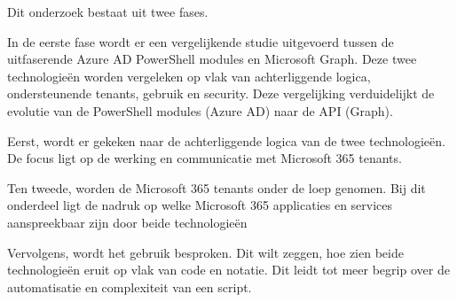 \begin{comment}
In de derde fase volgt een nabootsing van een realistische Linux-omgeving. Aan de hand van geautomatiseerde configuraties ontstaat de mogelijkheid om een omgeving op te zetten. Hierbij wordt Ansible als Configuration Management tool ingezet voor het opzetten van de infrastructuur. In de testomgeving voorzien we vier virtuele servers en een virtuele client. Waarbij alle virtuele machines AlmaLinux \autocite{AOF2022} als distributie gebruiken. De eerste server maakt gebruik van BIND \autocite{ISC2022} om de DNS (Domain Name System) te voorzien. De tweede server voorziet DHCP (Dynamic Host Configuration Protocol) met dynamische IP-adressen voor de virtuele client. De derde server fungeert als webserver en databank met een \textcite{WordPress2022} installatie. De laatste server maakt gebruik van Prometheus \autocite{PrometheusAuthors2022} en Grafana \autocite{GrafanaLabs2022} om de servers te kunnen monitoren. De client is een gebruiker van het domein en test de beschikbare functionaliteiten.

De laatste fase omvat een Disaster Recovery-scenario waarbij de omgeving wordt beschadigd. Door deze beschadiging wordt de omgeving nogmaals opgezet aan de hand van automatisatie uit de tweede fase. Er wordt gekeken naar welke impact de automatisatie heeft in vergelijking met de manuele manier van configureren. Deze impact wordt geanalyseerd en getest, nadien worden alle bevinden verwerkt in de scriptie.

\end{comment}

Dit onderzoek bestaat uit twee fases.
 
In de eerste fase wordt er een vergelijkende studie uitgevoerd tussen de uitfaserende Azure AD PowerShell modules en Microsoft Graph. Deze twee technologieën worden vergeleken op vlak van achterliggende logica, ondersteunende tenants, gebruik en security. Deze vergelijking verduidelijkt de evolutie van de PowerShell modules (Azure AD) naar de API (Graph).

Eerst, wordt er gekeken naar de achterliggende logica van de twee technologieën. De focus ligt op de werking en communicatie met Microsoft 365 tenants. 

Ten tweede, worden de Microsoft 365 tenants onder de loep genomen. Bij dit onderdeel ligt de nadruk op welke Microsoft 365 applicaties en services aanspreekbaar zijn door beide technologieën

Vervolgens, wordt het gebruik besproken. Dit wilt zeggen, hoe zien beide technologieën eruit op vlak van code en notatie. Dit leidt tot meer begrip over de automatisatie en complexiteit van een script.

